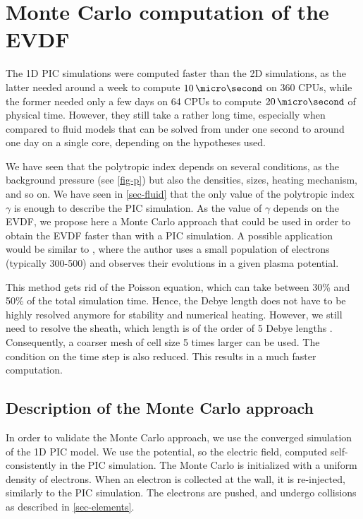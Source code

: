 
\section{Monte Carlo computation of the EVDF}
\label{sec-MCM}
  
  The \ac{1D} \ac{PIC} simulations were computed faster than the \ac{2D} simulations, as the latter needed around a week to compute $10\,\micro\second$ on 360 CPUs, while the former needed only a few days on 64 CPUs to compute $20\,\micro\second$ of physical time.
  However, they still take a rather long time, especially when compared to fluid models that can be solved from under one second to around one day on a single core, depending on the hypotheses used.
  
  We have seen that the polytropic index depends on several conditions, as the background pressure (see \cref{fig-p}) but also the densities, sizes, heating mechanism, and so on.
  We have seen in \cref{sec-fluid} that the only value of the polytropic index $\gamma$ is enough to describe the \ac{PIC} simulation.
  As the value of $\gamma$ depends on the \ac{EVDF}, we propose here a Monte Carlo approach that could be used in order to obtain the \ac{EVDF} faster than with a \ac{PIC} simulation.
  A possible application would be similar to \citet{kushner1983}, where the author uses a small population of electrons (typically 300-500) and observes their evolutions in a given plasma potential.
  
  This method gets rid of the Poisson equation, which can take between 30\% and 50\% of the total simulation time.
  Hence, the Debye length does not have to be highly resolved anymore for stability and numerical heating.
  However, we still need to resolve the sheath, which length is of the order of 5 Debye lengths \citep{chabert2014}.
  Consequently, a coarser mesh of cell size 5 times larger can be used.
  The condition on the time step is also reduced.
  This results in a much faster computation.

  \subsection{Description of the Monte Carlo approach}
    In order to validate the Monte Carlo approach, we use the converged simulation of the \ac{1D} \ac{PIC} model.
    We use the potential, so the electric field, computed self-consistently in the \ac{PIC} simulation.
    The Monte Carlo is initialized with a uniform density of electrons.
    When an electron is collected at the wall, it is re-injected, similarly to the \ac{PIC} simulation.
    The electrons are pushed, and undergo collisions as described in \cref{sec-elements}.

